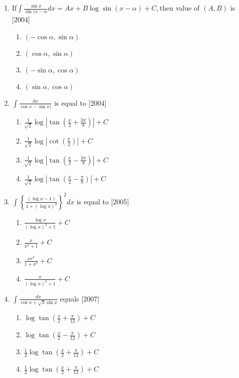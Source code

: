 \documentclass[journal,12pt,twocolumn]{IEEEtran}
\theoremstyle{remark}
\begin{document}
 \begin{enumerate}
\item If$\int$$\frac{\sin x}{\sin (x-\alpha}dx = Ax+B\log \sin (x-\alpha)+C,$then value of $(A,B)$ is    \hfill        [2004]
\begin{enumerate}
       \item { $(-\cos \alpha, \sin \alpha)$ }  
       \item  $(\cos \alpha,\sin \alpha)$
       \item    $(-\sin \alpha,\cos \alpha)$   
       \item  $(\sin \alpha,\cos \alpha)$ 
\end{enumerate}

\item   $\int\frac{dx}{\cos x-\sin x)}$ is equal to             \hfill [2004]
      \begin{enumerate}
\item  $\frac{1}{\sqrt{2}}\log \left|\tan \left(\frac{x}{2}+\frac{3\pi}{8}\right)\right|+C$

\item  $\frac{1}{\sqrt{2}}\log \left|\cot \left(\frac{x}{2}\right)\right|+C$ 

\item  {$\frac{1}{\sqrt{2}}\log \left|\tan \left(\frac{x}{2}-\frac{3\pi}{8}\right)\right|+C$}

\item  {$\frac{1}{\sqrt{2}}\log \left|\tan \left(\frac{x}{2}-\frac{\pi}{8}\right)\right|+C$}
\end{enumerate}
\item  $\int\left\{ \frac{(\log x-1)}{1+(\log x)^2}\right\}^2 dx$ is equal to     \hfill [2005]
 \begin{enumerate} 
\item  $\frac{\log x}{(\log x)^2 +1}+C$         
\item  $\frac{x}{x^2+1}+C$
\item  $\frac{xe^x}{1+x^2}+C$                       
\item  $\frac{x}{(\log x)^2+1}+C$
\end{enumerate}
\item $\int \frac{dx}{\cos x + \sqrt{3} \sin x}$ equals \hfill [2007]
  \begin{enumerate}
\item  $\log \tan \left(\frac{x}{2}+\frac{\pi}{12}\right)+C$
\item  $\log \tan \left(\frac{x}{2}-\frac{\pi}{12}\right)+C$
\item  $\frac{1}{2} \log \tan \left(\frac{x}{2}+\frac{\pi}{12}\right)+C$
\item  $\frac{1}{2} \log \tan \left(\frac{x}{2}+\frac{\pi}{12}\right)+C$
\end{enumerate}
 \end{enumerate}
\end{document}
